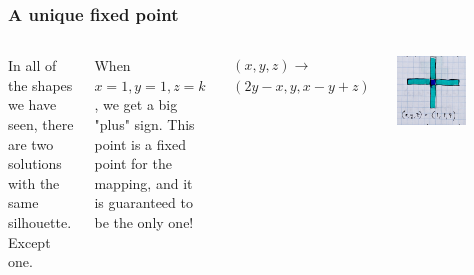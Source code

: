 \documentclass{beamer}
\begin{document}
\begin{frame}
	\frametitle{A unique fixed point}

	\begin{columns}

	In all of the shapes we have seen, there are two solutions with the same silhouette. Except one.

		\vspace{1ex}
		When $x=1, y=1, z=k$, we get a big "plus" sign. 
	This point is a fixed point for the mapping, and it is guaranteed to be the only one!
		\vspace{1ex}


	\begin{multline*} 
		(x,y,z) \rightarrow \\ (2y-x, y, x-y+z)
	\end{multline*}

	\begin{center}
             \includegraphics[width=0.6\textwidth]{Zagier_fixed_point.jpg}
        \end{center}

	\end{columns}

\end{frame}
\end{document}
